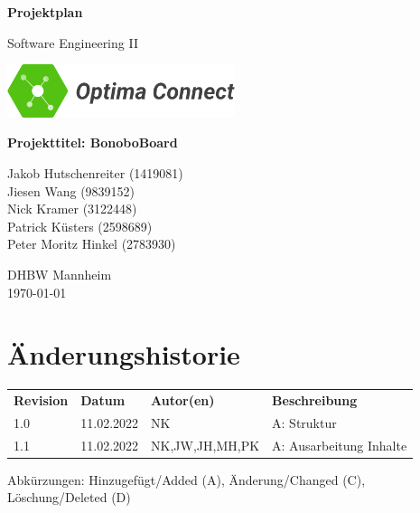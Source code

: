 \documentclass[a4paper,11pt]{scrartcl}
\begin{document}
\renewcommand*{\arraystretch}{1.2}
\begin{titlepage}
    \begin{center}
        \vspace*{1cm}\Huge
        \textbf{Projektplan}\par                
        \vspace{0.5cm}\LARGE        
        Software Engineering II\par           
        \vspace{2cm}
        \includegraphics[width=0.5\textwidth]{OptimaLogo_long}\par   
        \vspace{1cm}
        \textbf{Projekttitel: BonoboBoard}\par        
        \vfill\Large   
        Jakob Hutschenreiter (1419081)\\Jiesen Wang (9839152)\\Nick Kramer (3122448)\\Patrick Küsters (2598689)\\Peter Moritz Hinkel (2783930)\par
        \vspace{2cm}
        DHBW Mannheim\\
        \today     
    \end{center}
\end{titlepage}

\section*{Änderungshistorie}
\begin{table}[h]
	\begin{tabular}{@{} p{20mm} p{25mm} p{35mm} p{75mm}}
		\textbf{Revision} & \textbf{Datum} & \textbf{Autor(en)} & \textbf{Beschreibung}\\
		1.0 & 11.02.2022 & NK & A: Struktur\\
		1.1 & 11.02.2022 & NK,JW,JH,MH,PK & A: Ausarbeitung Inhalte\\
	\end{tabular}
\end{table}
\noindent
Abkürzungen: Hinzugefügt/Added (A), Änderung/Changed (C), Löschung/Deleted (D)
\vspace{2cm}
\tableofcontents
\newpage
{}
\end{document}
